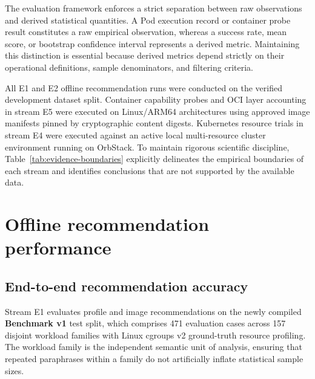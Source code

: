 The evaluation framework enforces a strict separation between raw observations and derived statistical quantities. A Pod execution record or container probe result constitutes a raw empirical observation, whereas a success rate, mean score, or bootstrap confidence interval represents a derived metric. Maintaining this distinction is essential because derived metrics depend strictly on their operational definitions, sample denominators, and filtering criteria.

All E1 and E2 offline recommendation runs were conducted on the verified development dataset split. Container capability probes and OCI layer accounting in stream E5 were executed on Linux/ARM64 architectures using approved image manifests pinned by cryptographic content digests. Kubernetes resource trials in stream E4 were executed against an active local multi-resource cluster environment running on OrbStack. To maintain rigorous scientific discipline, Table~\ref{tab:evidence-boundaries} explicitly delineates the empirical boundaries of each stream and identifies conclusions that are not supported by the available data.



\section{Offline recommendation performance}
\label{sec:offline_recommendation}

\subsection{End-to-end recommendation accuracy}
\label{subsec:e1_recommendation_quality}
\label{subsec:e1_quality}

Stream E1 evaluates profile and image recommendations on the newly compiled \textbf{Benchmark v1} test split, which comprises 471 evaluation cases across 157 disjoint workload families with Linux cgroups v2 ground-truth resource profiling. The workload family is the independent semantic unit of analysis, ensuring that repeated paraphrases within a family do not artificially inflate statistical sample sizes.


